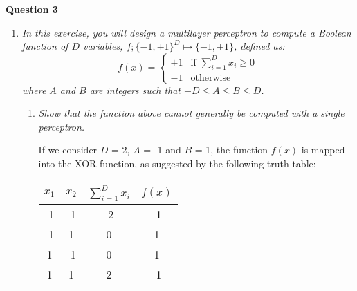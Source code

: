 \documentclass[12pt]{article}
\begin{document}
\center\large{\textbf{Question 3}}

\begin{enumerate}[leftmargin=\labelsep]
    \item \textit{In this exercise, you will design a multilayer perceptron to compute a Boolean function of $D$ variables, $f; \{-1, +1\}^D \mapsto \{-1, +1\}$, defined as:}
          \begin{equation}
              f(x) = \begin{cases}
                  +1 & \text{if } \sum\limits_{i=1}^D x_i \geq 0 \\
                  -1 & \text{otherwise}
              \end{cases}
          \end{equation}
          \textit{where $A$ and $B$ are integers such that $-D \leq A \leq B \leq D$.}

          \begin{enumerate}[label=\alph*)]
              \item \textit{Show that the function above cannot generally be computed with a single
                        perceptron.}

                    \vspace{12pt}

                    If we consider $D$ = 2, $A$ = -1 and $B$ = 1, the function $f(x)$ is mapped into the XOR function, as suggested by the following truth table:

                    \begin{table}[H]
                        \centering
                        \begin{tabular}{|c|c|c|c|}
                            \hline
                            $x_1$ & $x_2$ & $\sum\limits_{i=1}^D x_i$ & $f(x)$ \\ \hline
                            -1    & -1    & -2                        & -1     \\ \hline
                            -1    & 1     & 0                         & 1      \\ \hline
                            1     & -1    & 0                         & 1      \\ \hline
                            1     & 1     & 2                         & -1     \\ \hline
                        \end{tabular}
                    \end{table}


\end{enumerate}
\end{enumerate}
\end{document}
